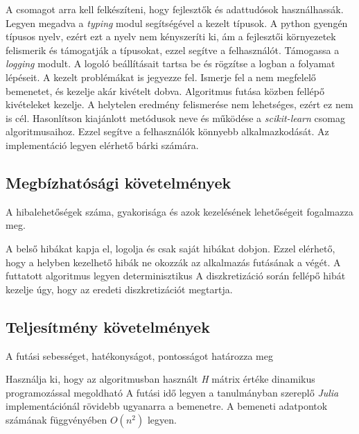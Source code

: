 \begin{enumerate}[resume]
     A csomagot arra kell felkészíteni, hogy fejlesztők és adattudósok használhassák.
     Legyen megadva a \textit{typing} modul segítségével a kezelt típusok. A python gyengén típusos nyelv, ezért ezt a nyelv nem kényszeríti ki, ám a fejlesztői környezetek felismerik és támogatják a típusokat, ezzel segítve a felhasználót.
     Támogassa a \textit{logging} modult. A logoló beállításait tartsa be és rögzítse a logban a folyamat lépéseit. A kezelt problémákat is jegyezze fel.
     Ismerje fel a nem megfelelő bemenetet, és kezelje akár kivételt dobva.
     Algoritmus futása közben fellépő kivételeket kezelje. A helytelen eredmény felismerése nem lehetséges, ezért ez nem is cél.
     Hasonlítson kiajánlott metódusok neve és működése a \textit{scikit-learn} csomag algoritmusaihoz. Ezzel segítve a felhasználók könnyebb alkalmazkodását.
     Az implementáció legyen elérhető bárki számára.
\end{enumerate}

\subsection{Megbízhatósági követelmények}
A hibalehetőségek száma, gyakorisága és azok kezelésének lehetőségeit fogalmazza meg.

\begin{enumerate}[resume]
     A belső hibákat kapja el, logolja és csak saját hibákat dobjon. Ezzel elérhető, hogy a helyben kezelhető hibák ne okozzák az alkalmazás futásának a végét.
     A futtatott algoritmus legyen determinisztikus
     A diszkretizáció során fellépő hibát kezelje úgy, hogy az eredeti diszkretizációt megtartja.
\end{enumerate}

\subsection{Teljesítmény követelmények}
A futási sebességet, hatékonyságot, pontosságot határozza meg

\begin{enumerate}[resume]
     Használja ki, hogy az algoritmusban használt \textit{H} mátrix értéke dinamikus programozással megoldható
     A futási idő legyen a tanulmányban szereplő \textit{Julia} implementációnál rövidebb ugyanarra a bemenetre.
     A bemeneti adatpontok számának függvényében $O(n^2)$ legyen.
\end{enumerate}

